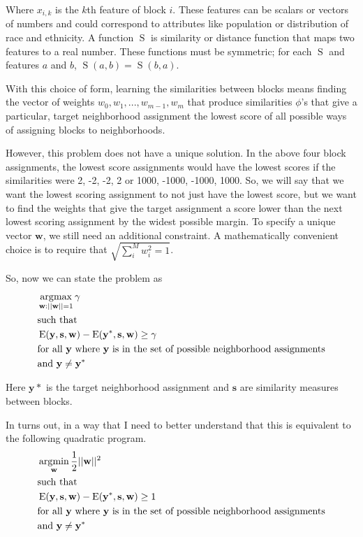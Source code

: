 Where $x_{i,k}$ is the $k$th feature of block $i$. These features can
be scalars or vectors of numbers and could correspond to attributes
like population or distribution of race and ethnicity. A function
$\operatorname{S}$ is similarity or distance function that maps two
features to a real number. These functions must be symmetric; for each
$\operatorname{S}$ and features $a$ and $b$, $\operatorname{S}(a,b) =
\operatorname{S}(b,a)$.

With this choice of form, learning the similarities between blocks
means finding the vector of weights $w_0, w_1, ..., w_{m-1}, w_m$ that
produce similarities $\phi$'s that give a particular, target
neighborhood assignment the lowest score of all possible ways of
assigning blocks to neighborhoods.

However, this problem does not have a unique solution. In the above
four block assignments, the lowest score assignments would have the
lowest scores if the similarities were 2, -2, -2, 2 or 1000, -1000,
-1000, 1000. So, we will say that we want the lowest scoring
assignment to not just have the lowest score, but we want to find the
weights that give the target assignment a score lower than the next
lowest scoring assignment by the widest possible margin. To specify a
unique vector $\mathbf{w}$, we still need an additional constraint. A
mathematically convenient choice is to require that $\sqrt{\sum_i^M
w_i^2 = 1}$.

So, now we can state the problem as 
%
\begin{align*}
&\operatorname*{\arg\!\max}_{\mathbf{w}:||\mathbf{w}||=1} \mathbf{\gamma} \\
&\text{such that} \\
&\operatorname{E}(\mathbf{y}, \mathbf{s}, \mathbf{w})
- \operatorname{E}(\mathbf{y}^*, \mathbf{s}, \mathbf{w}) \geq \gamma\\ 
&\text{for all } \mathbf{y} \text{ where } \mathbf{y} \text{ is in the set of
  possible neighborhood assignments}\\
&\text{and } \mathbf{y} \neq \mathbf{y}^*
\end{align*}
%

Here $\mathbf{y}*$ is the target neighborhood assignment and $\mathbf{s}$
are similarity measures between blocks. 


In turns out, in a way that I need to better understand that this is
equivalent to the following quadratic program.
%
\begin{align*}
&\operatorname*{\arg\!\min}_{\mathbf{w}} \frac{1}{2}||\mathbf{w}||^2 \\
&\text{such that} \\
&\operatorname{E}(\mathbf{y}, \mathbf{s}, \mathbf{w})
- \operatorname{E}(\mathbf{y}^*, \mathbf{s}, \mathbf{w}) \geq 1 \\ 
&\text{for all } \mathbf{y} \text{ where } \mathbf{y} \text{ is in the set of
  possible neighborhood assignments}\\
&\text{and } \mathbf{y} \neq \mathbf{y}^*
\end{align*}


